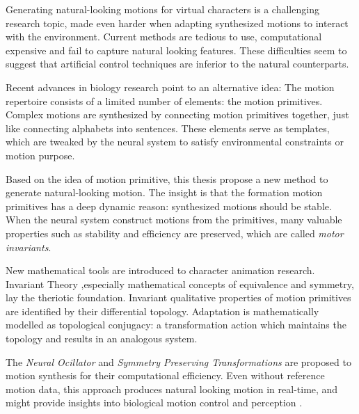 


\begin{abstracts}        %

Generating natural-looking motions for virtual characters is a challenging research topic, made even harder when adapting synthesized motions to interact with the environment. 
Current methods are tedious to use, computational expensive and fail to capture natural looking features.
These difficulties seem to suggest that artificial control techniques are inferior to the natural counterparts.

Recent advances in biology research point to an alternative idea:
The motion repertoire consists of a limited number of elements: the motion primitives. 
Complex motions are synthesized by connecting motion primitives together, just like connecting alphabets into sentences.
These elements serve as templates, which are tweaked by the neural system to satisfy  environmental constraints or motion purpose.


Based on the idea of motion primitive,   this thesis propose a new method to generate natural-looking motion.
The insight is that the formation motion primitives has a deep dynamic reason: synthesized motions should be stable. 
When the neural system construct motions from the primitives, many  valuable properties such as stability and efficiency are preserved, which are called \emph{motor invariants}.


New mathematical tools are introduced to character animation research.
Invariant Theory ,especially mathematical concepts of equivalence and symmetry, lay the theriotic foundation.
Invariant qualitative properties of motion primitives are identified by their  differential topology.
Adaptation is mathematically modelled as topological conjugacy: a transformation action which maintains the topology and results in an analogous system.

The \emph{Neural Ocillator} and \emph{Symmetry Preserving Transformations} are proposed to motion synthesis for their computational efficiency.
Even without reference motion data, this approach produces natural looking motion in real-time, and might  provide insights into biological motion  control and perception .

\end{abstracts}





